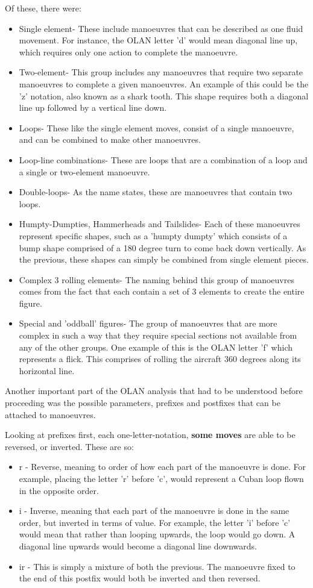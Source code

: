 Of these, there were:
\begin{itemize}
	\item Single element- These include manoeuvres that can be described as one fluid movement. For instance, the OLAN letter 'd' would mean diagonal line up, which requires only one action to complete the manoeuvre.
	\item Two-element- This group includes any manoeuvres that require two separate manoeuvres to complete a given manoeuvres. An example of this could be the 'z' notation, also known as a shark tooth. This shape requires both a diagonal line up followed by a vertical line down. 
	\item Loops- These like the single element moves, consist of a single manoeuvre, and can be combined to make other manoeuvres.
	\item Loop-line combinations- These are loops that are a combination of a loop and a single or two-element manoeuvre.
	\item Double-loops- As the name states, these are manoeuvres that contain two loops.
	\item Humpty-Dumpties, Hammerheads and Tailslides- Each of these manoeuvres represent specific shapes, such as a 'humpty dumpty' which consists of a bump shape comprised of a 180 degree turn to come back down vertically. As the previous, these shapes can simply be combined from single element pieces. 
	\item Complex 3 rolling elements- The naming behind this group of manoeuvres comes from the fact that each contain a set of 3 elements to create the entire figure.
	\item Special and 'oddball' figures- The group of manoeuvres that are more complex in such a way that they require special sections not available from any of the other groups. One example of this is the OLAN letter 'f' which represents a flick. This comprises of rolling the aircraft 360 degrees along its horizontal line.
\end{itemize}

Another important part of the OLAN analysis that had to be understood before proceeding was the possible parameters, prefixes and postfixes that can be attached to manoeuvres. 

Looking at prefixes first, each one-letter-notation, \textbf{some moves} are able to be reversed, or inverted. These are so:
\begin{itemize}
	\item r - Reverse, meaning to order of how each part of the manoeuvre is done. For example, placing the letter 'r' before 'c', would represent a Cuban loop flown in the opposite order. 
	\item i - Inverse, meaning that each part of the manoeuvre is done in the same order, but inverted in terms of value. For example, the letter 'i' before 'c' would mean that rather than looping upwards, the loop would go down. A diagonal line upwards would become a diagonal line downwards.
	\item ir - This is simply a mixture of both the previous. The manoeuvre fixed to the end of this postfix would both be inverted and then reversed. 
\end{itemize}


